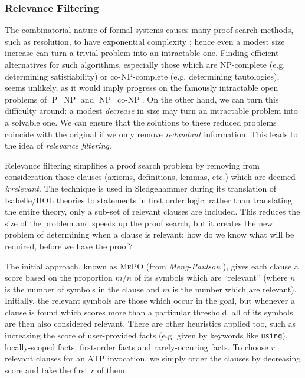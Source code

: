 \subsubsection{Relevance Filtering}
\label{sec:relevance}

\cite{kuhlwein2012overview}

The combinatorial nature of formal systems causes many proof search methods,
such as resolution, to have exponential complexity
\cite{haken1985intractability}; hence even a modest size increase can turn a
trivial problem into an intractable one. Finding efficient alternatives for such
algorithms, especially those which are NP-complete (e.g. determining
satisfiability) or co-NP-complete (e.g. determining tautologies), seems
unlikely, as it would imply progress on the famously intractable open problems
of $\text{P} = \text{NP}$ and $\text{NP} = \text{co-NP}$. On the other hand, we
can turn this difficulty around: a modest \emph{decrease} in size may turn an
intractable problem into a solvable one. We can ensure that the solutions to
these reduced problems coincide with the original if we only remove
\emph{redundant} information. This leads to the idea of \emph{relevance
  filtering}.

Relevance filtering simplifies a proof search problem by removing from
consideration those clauses (axioms, definitions, lemmas, etc.) which are deemed
\emph{irrelevant}. The technique is used in Sledgehammer during its translation
of Isabelle/HOL theories to statements in first order logic: rather than
translating the entire theory, only a sub-set of relevant clauses are
included. This reduces the size of the problem and speeds up the proof search,
but it creates the new problem of determining when a clause is relevant: how do
we know what will be required, before we have the proof?

The initial approach, known as \textsc{MePO} (from \emph{Meng-Paulson}
\cite{meng2009lightweight}), gives each clause a score based on the proportion
$m / n$ of its symbols which are ``relevant'' (where $n$ is the number of
symbols in the clause and $m$ is the number which are relevant). Initially, the
relevant symbols are those which occur in the goal, but whenever a clause is
found which scores more than a particular threshold, all of its symbols are then
also considered relevant. There are other heuristics applied too, such as
increasing the score of user-provided facts (e.g. given by keywords like
\texttt{using}), locally-scoped facts, first-order facts and rarely-occuring
facts. To choose $r$ relevant clauses for an ATP invocation, we simply order the
clauses by decreasing score and take the first $r$ of them.

